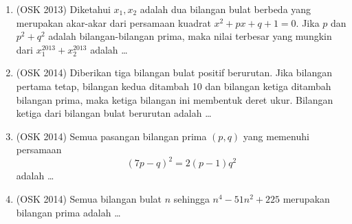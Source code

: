 \documentclass[11pt]{scrartcl}
\begin{document}
\begin{enumerate}
            \item (OSK 2013) Diketahui $x_1,x_2$ adalah dua bilangan bulat berbeda yang merupakan akar-akar dari persamaan kuadrat $x^2+px+q+1=0$. Jika $p$ dan $p^2+q^2$ adalah bilangan-bilangan prima, maka nilai terbesar yang mungkin dari $x_1^{2013}+x_2^{2013}$ adalah \dots
            
            \item (OSK 2014) Diberikan tiga bilangan bulat positif berurutan. Jika bilangan pertama tetap, bilangan kedua ditambah 10 dan bilangan ketiga ditambah bilangan prima, maka ketiga bilangan ini membentuk deret ukur. Bilangan ketiga dari bilangan bulat berurutan adalah \dots
            
            \item (OSK 2014) Semua pasangan bilangan prima $(p,q)$ yang memenuhi persamaan
            $$(7p-q)^2=2(p-1)q^2$$
            adalah \dots
            
            \item (OSK 2014) Semua bilangan bulat $n$ sehingga $n^4-51n^2+225$ merupakan bilangan prima adalah \dots
\end{enumerate}
\end{document}
